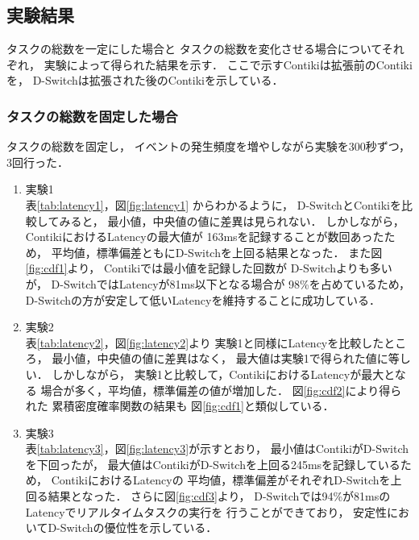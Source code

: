 \subsection{実験結果}
タスクの総数を一定にした場合と
タスクの総数を変化させる場合についてそれぞれ，
実験によって得られた結果を示す．
ここで示すContikiは拡張前のContikiを，
D-Switchは拡張された後のContikiを示している．

\subsubsection{タスクの総数を固定した場合}

\vspace{0.5em}タスクの総数を固定し，
イベントの発生頻度を増やしながら実験を300秒ずつ，3回行った．

\begin{enumerate}
\item{実験1}\\
表\ref{tab:latency1}，図\ref{fig:latency1}
からわかるように，
D-SwitchとContikiを比較してみると，
最小値，中央値の値に差異は見られない．
しかしながら，
ContikiにおけるLatencyの最大値が
163msを記録することが数回あったため，
平均値，標準偏差ともにD-Switchを上回る結果となった．
また図\ref{fig:cdf1}より，
Contikiでは最小値を記録した回数が
D-Switchよりも多いが，
D-SwitchではLatencyが81ms以下となる場合が
98\%を占めているため，
D-Switchの方が安定して低いLatencyを維持することに成功している．
\newline
\item{実験2}\\
表\ref{tab:latency2}，図\ref{fig:latency2}より
実験1と同様にLatencyを比較したところ，
最小値，中央値の値に差異はなく，
最大値は実験1で得られた値に等しい．
しかしながら，
実験1と比較して，ContikiにおけるLatencyが最大となる
場合が多く，平均値，標準偏差の値が増加した．
図\ref{fig:cdf2}により得られた
累積密度確率関数の結果も
図\ref{fig:cdf1}と類似している．
\newline
\item{実験3}\\
表\ref{tab:latency3}，図\ref{fig:latency3}が示すとおり，
最小値はContikiがD-Switchを下回ったが，
最大値はContikiがD-Switchを上回る245msを記録しているため，
ContikiにおけるLatencyの
平均値，標準偏差がそれぞれD-Switchを上回る結果となった．
さらに図\ref{fig:cdf3}より，
D-Switchでは94\%が81msのLatencyでリアルタイムタスクの実行を
行うことができており，
安定性においてD-Switchの優位性を示している．
\end{enumerate}


